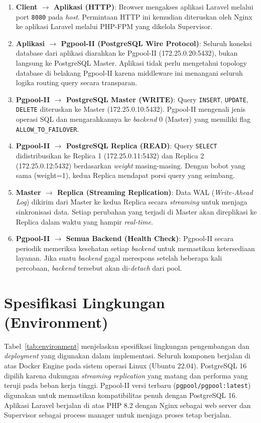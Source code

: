 \begin{enumerate}
    \item \textbf{Client $\rightarrow$ Aplikasi (HTTP)}: Browser
    mengakses aplikasi Laravel melalui port \texttt{8080} pada
    \textit{host}. Permintaan HTTP ini kemudian diteruskan oleh Nginx
    ke aplikasi Laravel melalui PHP-FPM yang dikelola Supervisor.
    \item \textbf{Aplikasi $\rightarrow$ Pgpool-II (PostgreSQL Wire
    Protocol)}: Seluruh koneksi database dari aplikasi diarahkan ke
    Pgpool-II (172.25.0.20:5432), bukan langsung ke PostgreSQL Master.
    Aplikasi tidak perlu mengetahui topology database di belakang
    Pgpool-II karena middleware ini menangani seluruh logika routing
    query secara transparan.
    \item \textbf{Pgpool-II $\rightarrow$ PostgreSQL Master (WRITE)}:
    Query \texttt{INSERT}, \texttt{UPDATE}, \texttt{DELETE} diteruskan
    ke Master (172.25.0.10:5432). Pgpool-II mengenali jenis operasi
    SQL dan mengarahkannya ke \textit{backend} 0 (Master) yang
    memiliki flag \texttt{ALLOW\_TO\_FAILOVER}.
    \item \textbf{Pgpool-II $\rightarrow$ PostgreSQL Replica (READ)}:
    Query \texttt{SELECT} didistribusikan ke Replica 1
    (172.25.0.11:5432) dan Replica 2 (172.25.0.12:5432) berdasarkan
    \textit{weight} masing-masing. Dengan bobot yang sama (weight=1),
    kedua Replica mendapat porsi query yang seimbang.
    \item \textbf{Master $\rightarrow$ Replica (Streaming
    Replication)}: Data WAL (\textit{Write-Ahead Log}) dikirim dari
    Master ke kedua Replica secara \textit{streaming} untuk menjaga
    sinkronisasi data. Setiap perubahan yang terjadi di Master akan
    direplikasi ke Replica dalam waktu yang hampir \textit{real-time}.
    \item \textbf{Pgpool-II $\rightarrow$ Semua Backend (Health
    Check)}: Pgpool-II secara periodik memeriksa kesehatan setiap
    \textit{backend} untuk memastikan ketersediaan layanan. Jika suatu
    \textit{backend} gagal merespons setelah beberapa kali percobaan,
    \textit{backend} tersebut akan di-\textit{detach} dari pool.
\end{enumerate}

\section{Spesifikasi Lingkungan (Environment)}

Tabel~\ref{tab:environment} menjelaskan spesifikasi lingkungan
pengembangan dan \textit{deployment} yang digunakan dalam
implementasi. Seluruh komponen berjalan di atas Docker Engine pada
sistem operasi Linux (Ubuntu 22.04). PostgreSQL 16 dipilih karena
dukungan \textit{streaming replication} yang matang dan performa yang
teruji pada beban kerja tinggi. Pgpool-II versi terbaru
(\texttt{pgpool/pgpool:latest}) digunakan untuk memastikan
kompatibilitas penuh dengan PostgreSQL 16. Aplikasi Laravel berjalan
di atas PHP 8.2 dengan Nginx sebagai web server dan Supervisor sebagai
process manager untuk menjaga proses tetap berjalan.

